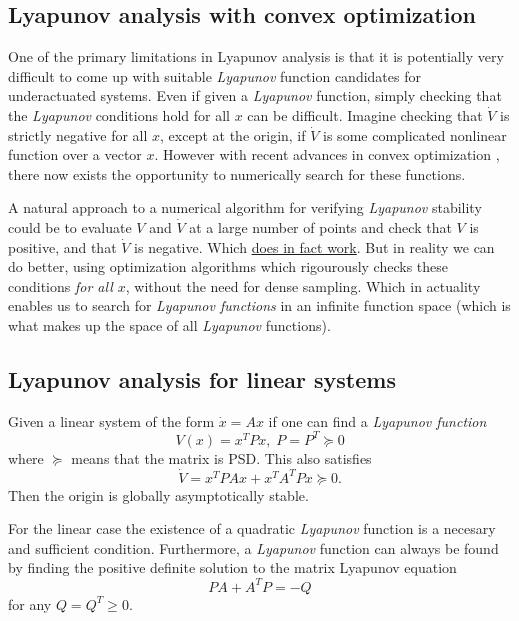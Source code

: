 \subsection{Lyapunov analysis with convex optimization}
\label{subsec:Lyapunov analysis with convex optimization}

One of the primary limitations in Lyapunov analysis is that it is potentially
very difficult to come up with suitable \textit{Lyapunov} function candidates
for underactuated systems. Even if given a \textit{Lyapunov} function, simply
checking that the \textit{Lyapunov} conditions hold for all \(x\) can be
difficult. Imagine checking that \(\dot{V}\) is strictly negative for all \(x\),
except at the origin, if \(\dot{V}\) is some complicated nonlinear function over
a vector \(x\). However with recent advances in convex optimization
\cite{parilloStructuredSemidefinitePrograms}, there now exists the opportunity
to numerically search for these functions.

A natural approach to a numerical algorithm for verifying \textit{Lyapunov}
stability could be to evaluate \(V\) and \(\dot{V}\) at a large number of points
and check that \(V\) is positive, and that \(\dot{V}\) is negative. Which
\href{https://github.com/RobotLocomotion/drake/blob/master/systems/analysis/test/lyapunov_test.cc}{does
  in fact work}. But in reality we can do better, using optimization algorithms
which rigourously checks these conditions \textit{for all \(x\)}, without the
need for dense sampling. Which in actuality enables us to search for
\textit{Lyapunov functions} in an infinite function space (which is what makes
up the space of all \textit{Lyapunov} functions).

\subsection{Lyapunov analysis for linear systems}
\label{subsec:Lyapunov analysis for linear systems}

\begin{theorem}
  Given a linear system of the form \(\dot{x} = Ax\) if one can find a
  \textit{Lyapunov function}
  \[
    V(x) = x^{T}Px, \; P = P^{T} \succeq 0
  \]
  where \(\succeq\) means that the matrix is \ac{PSD}. This also satisfies
  \[
    \dot{V} = x^{T}PAx + x^{T}A^{T}Px \succeq 0.
  \]
  Then the origin is globally asymptotically stable.
\end{theorem} \cite{tedrakeUnderactuatedRoboticsAlgorithms2019}

For the linear case the existence of a quadratic \textit{Lyapunov} function is a
necesary and sufficient condition. Furthermore, a \textit{Lyapunov} function can
always be found by finding the positive definite solution to the matrix Lyapunov
equation
\begin{equation}
  \label{eqn:linearlyapunov}
  PA + A^{T}P = -Q
\end{equation}
for any \(Q = Q^{T} \geqslant 0\).

